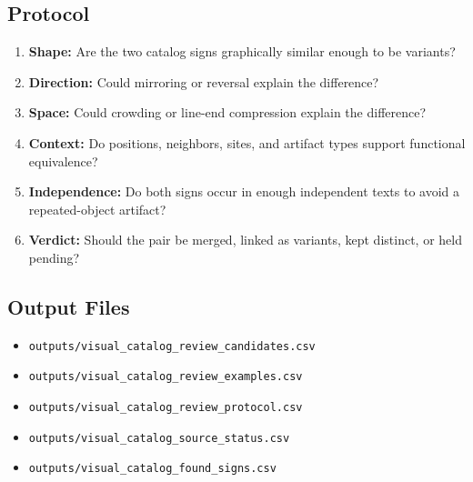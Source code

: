 ﻿\documentclass[11pt,a4paper]{article}
\begin{document}
\subsection*{Protocol}
\begin{enumerate}
\item \textbf{Shape:} Are the two catalog signs graphically similar enough to be variants?
\item \textbf{Direction:} Could mirroring or reversal explain the difference?
\item \textbf{Space:} Could crowding or line-end compression explain the difference?
\item \textbf{Context:} Do positions, neighbors, sites, and artifact types support functional equivalence?
\item \textbf{Independence:} Do both signs occur in enough independent texts to avoid a repeated-object artifact?
\item \textbf{Verdict:} Should the pair be merged, linked as variants, kept distinct, or held pending?
\end{enumerate}
\subsection*{Output Files}
\begin{itemize}
\item \texttt{outputs/visual\_catalog\_review\_candidates.csv}
\item \texttt{outputs/visual\_catalog\_review\_examples.csv}
\item \texttt{outputs/visual\_catalog\_review\_protocol.csv}
\item \texttt{outputs/visual\_catalog\_source\_status.csv}
\item \texttt{outputs/visual\_catalog\_found\_signs.csv}
\end{itemize}
\end{document}
